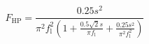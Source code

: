 \begin{equation}
F_{\mathrm{HP}} = \frac{0.25 s^{2}}{\pi^{2} f_{\mathrm{l}}^{2} \left(1 + \frac{0.5 \sqrt{2} s}{\pi f_{\mathrm{l}}} + \frac{0.25 s^{2}}{\pi^{2} f_{\mathrm{l}}^{2}}\right)}
\end{equation}

